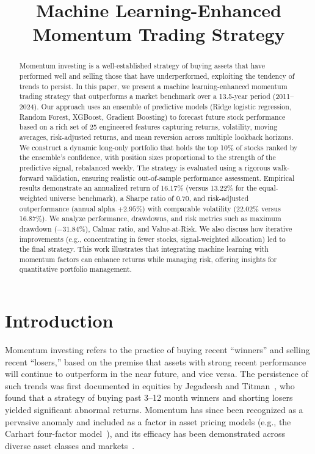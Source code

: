 \documentclass[conference]{IEEEtran}
\begin{document}
\title{Machine Learning-Enhanced Momentum Trading Strategy}

\author{
}

\maketitle

\begin{abstract}
Momentum investing is a well-established strategy of buying assets that have performed well and selling those that have underperformed, exploiting the tendency of trends to persist. In this paper, we present a machine learning-enhanced momentum trading strategy that outperforms a market benchmark over a 13.5-year period (2011--2024). Our approach uses an ensemble of predictive models (Ridge logistic regression, Random Forest, XGBoost, Gradient Boosting) to forecast future stock performance based on a rich set of 25 engineered features capturing returns, volatility, moving averages, risk-adjusted returns, and mean reversion across multiple lookback horizons. We construct a dynamic long-only portfolio that holds the top 10\% of stocks ranked by the ensemble's confidence, with position sizes proportional to the strength of the predictive signal, rebalanced weekly. The strategy is evaluated using a rigorous walk-forward validation, ensuring realistic out-of-sample performance assessment. Empirical results demonstrate an annualized return of 16.17\% (versus 13.22\% for the equal-weighted universe benchmark), a Sharpe ratio of 0.70, and risk-adjusted outperformance (annual alpha $+2.95\%$) with comparable volatility (22.02\% versus 16.87\%). We analyze performance, drawdowns, and risk metrics such as maximum drawdown ($-31.84\%$), Calmar ratio, and Value-at-Risk. We also discuss how iterative improvements (e.g., concentrating in fewer stocks, signal-weighted allocation) led to the final strategy. This work illustrates that integrating machine learning with momentum factors can enhance returns while managing risk, offering insights for quantitative portfolio management.
\end{abstract}

\section{Introduction}

Momentum investing refers to the practice of buying recent ``winners'' and selling recent ``losers,'' based on the premise that assets with strong recent performance will continue to outperform in the near future, and vice versa. The persistence of such trends was first documented in equities by Jegadeesh and Titman~\cite{jegadeesh1993}, who found that a strategy of buying past 3--12 month winners and shorting losers yielded significant abnormal returns. Momentum has since been recognized as a pervasive anomaly and included as a factor in asset pricing models (e.g., the Carhart four-factor model~\cite{carhart1997}), and its efficacy has been demonstrated across diverse asset classes and markets~\cite{asness2013}.
\end{document}
